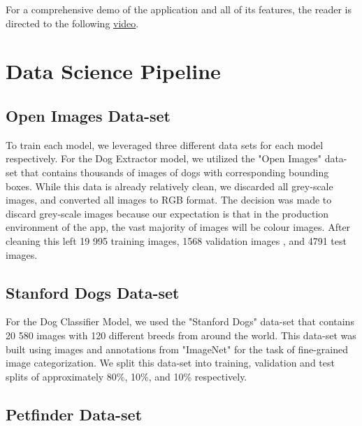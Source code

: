 \documentclass{article}
\begin{document}
\noindent  For a comprehensive demo of the application and all of its features, the reader is directed to the following \href{https://youtu.be/jVjqX4sfAKU}{video}.

\newpage

\section{Data Science Pipeline}

\subsection{Open Images Data-set}

To train each model, we leveraged three different data sets for each model respectively.  For the Dog Extractor model, we utilized the "Open Images" \cite{openimages} data-set that contains thousands of images of dogs with corresponding bounding boxes.  While this data is already relatively clean, we discarded all grey-scale images, and converted all images to RGB format.  The decision was made to discard grey-scale images because our expectation is that in the production environment of the app, the vast majority of images will be colour images.  After cleaning this left 19 995 training images, 1568 validation images , and 4791 test images.

\subsection{Stanford Dogs Data-set}

For the Dog Classifier Model, we used the "Stanford Dogs" data-set \cite{stanforddogs} that contains 20 580 images with 120 different breeds from around the world. This data-set was built using images and annotations from "ImageNet" \cite{imagenet} for the task of fine-grained image categorization.  We split this data-set into training, validation and test splits of approximately 80\%, 10\%, and 10\% respectively.

\subsection{Petfinder Data-set}
\end{document}
